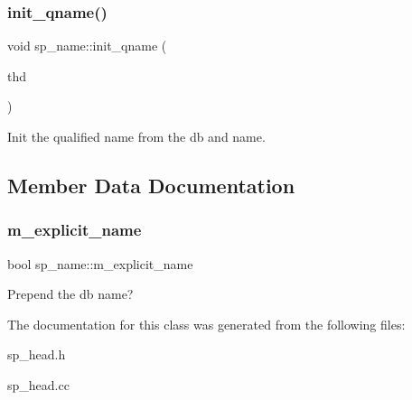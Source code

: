 \subsubsection{\texorpdfstring{init\+\_\+qname()}{init\_qname()}}
{\footnotesize\ttfamily void sp\+\_\+name\+::init\+\_\+qname (\begin{DoxyParamCaption}\item[{T\+HD $\ast$}]{thd }\end{DoxyParamCaption})}

Init the qualified name from the db and name. 

\subsection{Member Data Documentation}
\mbox{\label{classsp__name_a6ddb16b2a338929f8cab46a8c37f1f5f}} 
\subsubsection{\texorpdfstring{m\+\_\+explicit\+\_\+name}{m\_explicit\_name}}
{\footnotesize\ttfamily bool sp\+\_\+name\+::m\+\_\+explicit\+\_\+name}

Prepend the db name? 

The documentation for this class was generated from the following files\+:\begin{DoxyCompactItemize}
\item 
sp\+\_\+head.\+h\item 
sp\+\_\+head.\+cc\end{DoxyCompactItemize}
